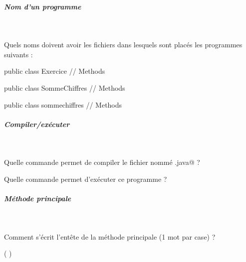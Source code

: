 \documentclass[11pt,a4paper]{article}
\begin{document}
			
		\subparagraph{Nom d'un programme} 
		
                \textcolor{white}{.} \par
            Quels noms doivent avoir les fichiers dans lesquels sont plac\'es les programmes suivants :\begin{Java}
    public class Exercice {  
        // Methods    
    }						\end{Java} \textcolor{gray}{\underline{\hspace*{10em}}} \begin{Java}
    public class SommeChiffres {
        // Methods    
    }						\end{Java} \textcolor{gray}{\underline{\hspace*{16em}}} \begin{Java}
    public class sommechiffres {    
        // Methods    
    }						\end{Java} \textcolor{gray}{\underline{\hspace*{16em}}} 
			
		\subparagraph{Compiler/ex\'ecuter} 
		
                \textcolor{white}{.} \par
             
							Quelle commande permet de compiler le fichier nomm\'e \verb@SommeChiffres.java@ ?  
							\par
				 \textcolor{gray}{\underline{\hspace*{3em}}}  \textcolor{gray}{\underline{\hspace*{16em}}} \par
				
							Quelle commande permet d'ex\'ecuter ce programme ?  
							\par
				 \textcolor{gray}{\underline{\hspace*{3em}}}  \textcolor{gray}{\underline{\hspace*{10em}}} 
			
		\subparagraph{M\'ethode principale} 
		
                \textcolor{white}{.} \par
            
								Comment s'\'ecrit l'ent\^ete de la m\'ethode principale (1 mot par case) ?
							
            \par
         \textcolor{gray}{\underline{\hspace*{5em}}}  \textcolor{gray}{\underline{\hspace*{5em}}}  \textcolor{gray}{\underline{\hspace*{3em}}}  \textcolor{gray}{\underline{\hspace*{3em}}}  
							(            
							 \textcolor{gray}{\underline{\hspace*{5em}}}  \textcolor{gray}{\underline{\hspace*{2em}}}  \textcolor{gray}{\underline{\hspace*{3em}}}  
							)   
						
\end{document}
